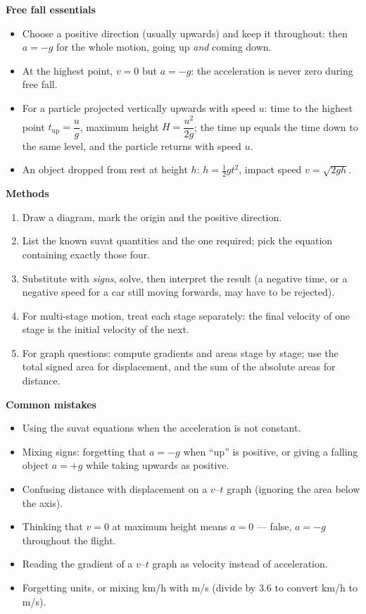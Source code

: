 \documentclass[11pt]{article}
\begin{document}
\begin{aretenir}
\textbf{Free fall essentials}
\begin{itemize}
\item Choose a positive direction (usually upwards) and keep it throughout: then $a=-g$ for the whole motion, going up \emph{and} coming down.
\item At the highest point, $v=0$ but $a=-g$: the acceleration is never zero during free fall.
\item For a particle projected vertically upwards with speed $u$: time to the highest point $t_{\text{up}}=\dfrac{u}{g}$, maximum height $H=\dfrac{u^{2}}{2g}$; the time up equals the time down to the same level, and the particle returns with speed $u$.
\item An object dropped from rest at height $h$: $h=\tfrac12 gt^{2}$, impact speed $v=\sqrt{2gh}$.
\end{itemize}

\textbf{Methods}
\begin{enumerate}
\item Draw a diagram, mark the origin and the positive direction.
\item List the known suvat quantities and the one required; pick the equation containing exactly those four.
\item Substitute with \emph{signs}, solve, then interpret the result (a negative time, or a negative speed for a car still moving forwards, may have to be rejected).
\item For multi-stage motion, treat each stage separately: the final velocity of one stage is the initial velocity of the next.
\item For graph questions: compute gradients and areas stage by stage; use the total signed area for displacement, and the sum of the absolute areas for distance.
\end{enumerate}

\textbf{Common mistakes}
\begin{itemize}
\item Using the suvat equations when the acceleration is not constant.
\item Mixing signs: forgetting that $a=-g$ when ``up'' is positive, or giving a falling object $a=+g$ while taking upwards as positive.
\item Confusing distance with displacement on a $v$--$t$ graph (ignoring the area below the axis).
\item Thinking that $v=0$ at maximum height means $a=0$ --- false, $a=-g$ throughout the flight.
\item Reading the gradient of a $v$--$t$ graph as velocity instead of acceleration.
\item Forgetting units, or mixing km/h with m/s (divide by $3.6$ to convert km/h to m/s).
\end{itemize}


\end{aretenir}
\end{document}
